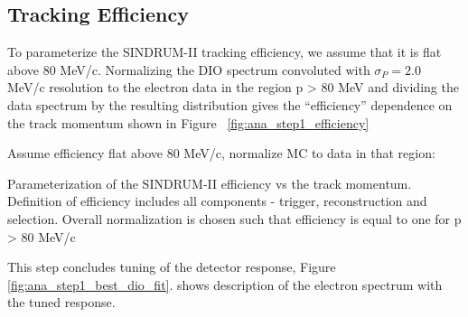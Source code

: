 \subsection{Tracking Efficiency}

To parameterize the SINDRUM-II tracking efficiency, we assume that it is flat
above 80 MeV/c. Normalizing the DIO spectrum convoluted with $\sigma_P = 2.0$ MeV/c
resolution to the electron data in the region p > 80 MeV and dividing the data spectrum
by the resulting distribution gives the ``efficiency'' dependence on the track momentum
shown in Figure ~\ref{fig:ana_step1_efficiency}

Assume efficiency flat above 80 MeV/c, normalize MC to data in that region:

%
 {
  \label{fig:ana_step1_efficiency}
  Parameterization of the SINDRUM-II efficiency vs the track momentum.
  Definition of efficiency includes all components - trigger, reconstruction and selection.
  Overall normalization is chosen such that efficiency is equal to one for p > 80 MeV/c
}
\vspace{0.2in}

This step concludes tuning of the detector response, Figure \ref{fig:ana_step1_best_dio_fit}.
shows description of the electron spectrum with the tuned response.

